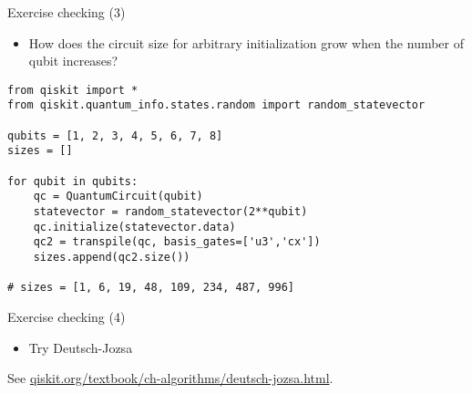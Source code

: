 
\begin{frame}[fragile]{Exercise checking (3)}

\begin{itemize} 
\item How does the circuit size for arbitrary initialization grow when the number of qubit increases?
\end{itemize}

\begin{verbatim}
from qiskit import * 
from qiskit.quantum_info.states.random import random_statevector

qubits = [1, 2, 3, 4, 5, 6, 7, 8]
sizes = []

for qubit in qubits:
	qc = QuantumCircuit(qubit)
	statevector = random_statevector(2**qubit)
	qc.initialize(statevector.data)
	qc2 = transpile(qc, basis_gates=['u3','cx'])
	sizes.append(qc2.size())
	
# sizes = [1, 6, 19, 48, 109, 234, 487, 996]
\end{verbatim}

\end{frame}



\begin{frame}[fragile]{Exercise checking (4)}

\begin{itemize} 
\item Try Deutsch-Jozsa
\end{itemize}

\bigskip See \url{qiskit.org/textbook/ch-algorithms/deutsch-jozsa.html}.

\end{frame}

